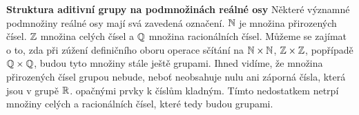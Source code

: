 \wikitextrule
\begin{example}\label{mai:exam049}
  \textbf{Struktura aditivní grupy na podmnožinách reálné osy}\newline\small
     Některé významné podmnožiny reálné osy mají svá zavedená označení. \(\mathbb{N}\) je množina 
     přirozených čísel. \(\mathbb{Z}\) množina celých čísel a \(\mathbb{Q}\) množina racionálních 
     čísel. Můžeme se zajímat o to, zda při zúžení definičního oboru operace sčítání na 
     \(\mathbb{N} \times \mathbb{N} \), \(\mathbb{Z} \times \mathbb{Z}\), popřípadě \(\mathbb{Q} \times 
     \mathbb{Q}\), budou tyto množiny stále ještě grupami. Ihned vidíme, že množina přirozených 
     čísel grupou nebude, neboť neobsahuje nulu ani záporná čísla, která jsou v grupě \(\mathbb{R}\). 
     opačnými prvky k číslům kladným. Tímto nedostatkem netrpí množiny celých a racionálních čísel, 
     které tedy budou grupami.
  \normalsize
\end{example}